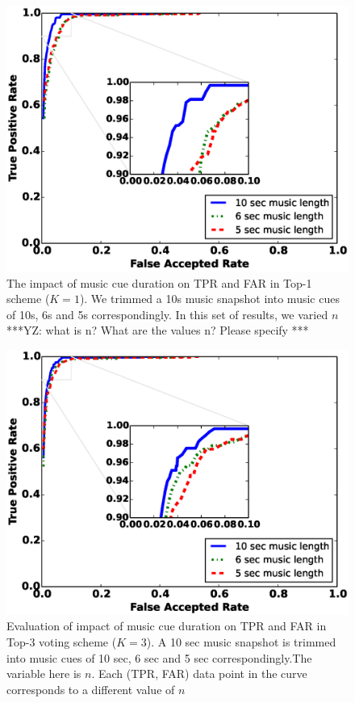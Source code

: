\begin{figure}[t]
\centering
\includegraphics [width=\columnwidth]{figure/top1_roc.eps}
\caption{The impact of music cue duration on TPR and FAR in Top-1 scheme ($K = 1$). We trimmed a 10s music snapshot into music cues of 10s, 6s and 5s correspondingly. In this set of results, we varied $n$ ***YZ: what is n? What are the values n? Please specify ***}
\label{fig:roc-top1}
\end{figure}

\begin{figure}[t]
\centering
\includegraphics [width=\columnwidth]{figure/top3_roc.eps}
\caption{Evaluation of impact of music cue duration on TPR and FAR in Top-3
voting scheme ($K = 3$). A 10 sec music snapshot is trimmed into music cues of
10 sec, 6 sec and 5 sec correspondingly.The variable here is $n$. Each (TPR, FAR) data point in the curve corresponds to a different value of $n$}
\label{fig:roc-top3}
\end{figure}

